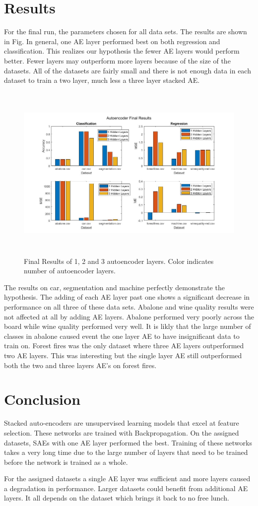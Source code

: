 \documentclass[twoside,11pt]{article}
\begin{document}
\section{Results}
	For the final run, the parameters chosen for all data sets. The results are shown in Fig. In general, one AE layer performed best on both regression and classification. This realizes our hypothesis the fewer AE layers would perform better. Fewer layers may outperform more layers because of the size of the datasets. All of the datasets are fairly small and there is not enough data in each dataset to train a two layer, much less a three layer stacked AE. 
	\begin{figure}[h]
		\centering
		\includegraphics[height=3.4in]{AEresults.jpg}
		\caption{Final Results of 1, 2 and 3 autoencoder layers. Color indicates number of autoencoder layers.}
		\label{2-hl}
	\end{figure}
	The results on car, segmentation and machine perfectly demonstrate the hypothesis. The adding of each AE layer past one shows a significant decrease in performance on all three of these data sets. Abalone and wine quality results were not affected at all by adding AE layers. Abalone performed very poorly across the board while wine quality performed very well. It is likly that the large number of classes in abalone caused event the one layer AE to have insignificant data to train on.  Forest fires was the only dataset where three AE layers outperformed two AE layers. This was interesting but the  single layer AE still outperformed both the two and three layers AE's on forest fires.
	
\section{Conclusion}
	Stacked auto-encoders are unsupervised learning models that excel at feature selection. These networks are trained with Backpropagation. On the assigned datasets, SAEs with one AE layer performed the best. Training of these networks takes a very long time due to the large number of layers that need to be trained before the network is trained as a whole. 
	
	For the assigned datasets a single AE layer was sufficient and more layers caused a degradation in performance. Larger datasets could benefit from additional AE layers. It all depends on the dataset which brings it back to no free lunch.
\newpage


\end{document}
